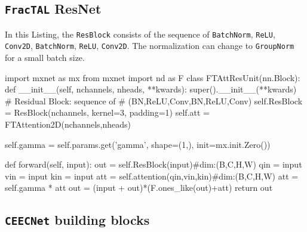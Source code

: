 \documentclass[times, 5p]{elsarticle}
\def \FracTAL {\texttt{FracTAL} }
\newcommand{\ceecnet}{\texttt{CEECNet}}
\begin{document}
\subsection{\FracTAL ResNet}

In this Listing, the \texttt{ResBlock} consists of the sequence of \texttt{BatchNorm}, \texttt{ReLU}, \texttt{Conv2D}, \texttt{BatchNorm}, \texttt{ReLU}, \texttt{Conv2D}. The normalization can change to \texttt{GroupNorm} for a small batch size. 

\begin{python}[caption={\textsc{mxnet/gluon} style pseudocode for the Residual Attention Fusion module},
emph={FTAttResUnit,forward,__init__},emphstyle=\textcolor{magenta},label={FTAttResUnitCODE}]
import mxnet as mx
from mxnet import nd as F
class FTAttResUnit(nn.Block):
    def __init__(self, nchannels, nheads, **kwards):
        super().__init__(**kwards)
        # Residual Block: sequence of
        # (BN,ReLU,Conv,BN,ReLU,Conv)
        self.ResBlock = ResBlock(nchannels,
                          kernel=3,
                          padding=1)
        self.att = FTAttention2D(nchannels,nheads)

        self.gamma  = self.params.get('gamma',
                      shape=(1,),
                      init=mx.init.Zero())

    def forward(self, input):
        out = self.ResBlock(input)#dim:(B,C,H,W)        
        qin = input
        vin = input
        kin = input
        att = self.attention(qin,vin,kin)#dim:(B,C,H,W)
        att = self.gamma * att
        out = (input + out)*(F.ones_like(out)+att)
        return out
\end{python}


\subsection{\ceecnet{} building blocks}
\end{document}
